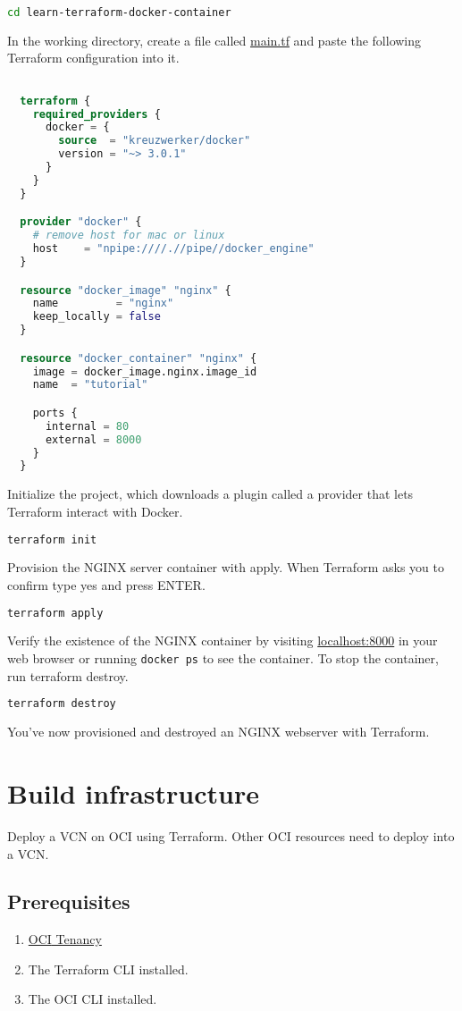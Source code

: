 \documentclass[../main.tex]{subfiles}
\begin{document}
\begin{lstlisting}[language=bash]
  cd learn-terraform-docker-container
\end{lstlisting}
In the working directory, create a file called \href{run:../resources/learn-terraform-docker-container/main.tf}{main.tf} and paste the following Terraform configuration into it.
\begin{lstlisting}[language=Terraform, caption={main.tf}]

  terraform {
    required_providers {
      docker = {
        source  = "kreuzwerker/docker"
        version = "~> 3.0.1"
      }
    }
  }

  provider "docker" {
    # remove host for mac or linux
    host    = "npipe:////.//pipe//docker_engine"
  }

  resource "docker_image" "nginx" {
    name         = "nginx"
    keep_locally = false
  }

  resource "docker_container" "nginx" {
    image = docker_image.nginx.image_id
    name  = "tutorial"

    ports {
      internal = 80
      external = 8000
    }
  }
\end{lstlisting}
Initialize the project, which downloads a plugin called a provider that lets Terraform interact with Docker.

\begin{lstlisting}[language=bash]
  terraform init
\end{lstlisting}
Provision the NGINX server container with apply. When Terraform asks you to confirm type yes and press ENTER.
\begin{lstlisting}[language=bash]
  terraform apply
\end{lstlisting}
Verify the existence of the NGINX container by visiting \url{localhost:8000} in your web browser or running \lstinline{docker ps} to see the container.
To stop the container, run terraform destroy.
\begin{lstlisting}[language=bash]
  terraform destroy
\end{lstlisting}
You've now provisioned and destroyed an NGINX webserver with Terraform.

\section{Build infrastructure}
Deploy a \gls{VCN} on \gls{OCI} using Terraform. Other \gls{OCI} resources need to deploy into a VCN.
\subsection{Prerequisites}
\begin{enumerate}
  \item{\href{https://docs.oracle.com/en/cloud/foundation/cloud_architecture/governance/tenancy.html}{\gls{OCI} Tenancy}}
  \item{The Terraform \gls{CLI} installed.}
  \item{The \gls{OCI} \gls{CLI} installed.}
\end{enumerate}
\end{document}
